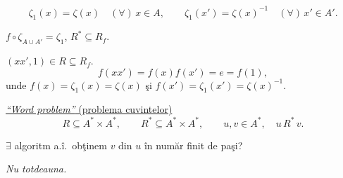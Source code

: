 \noindent
\[
\zeta_1(x)=\zeta(x)\quad(\forall)\,x\in A,
\qquad
\zeta_1(x')=\zeta(x)^{-1}\quad(\forall)\,x'\in A'.
\]

\noindent $f\circ\zeta_{A\cup A'}=\zeta_1$,
\qquad $R^*\subseteq R_f$.

\medskip
\noindent $(xx',1)\in R\subseteq R_f$.
\[
f(xx')=f(x)f(x')=e=f(1),
\]
\noindent unde $f(x)=\zeta_1(x)=\zeta(x)$ \c{s}i
$f(x')=\zeta_1(x')=\zeta(x)^{-1}$.

\bigskip
\noindent\underline{\textit{``Word problem''} (problema cuvintelor)}
\[
R\subseteq A^*\times A^*,\qquad
R^*\subseteq A^*\times A^*,\qquad
u,v\in A^*,\quad u\,R^*\,v.
\]

\noindent $\exists$ algoritm a.\^{i}.\ ob\c{t}inem $v$ din $u$
\^{i}n num\u{a}r finit de pa\c{s}i?

\medskip
\noindent\textit{Nu totdeauna.}
